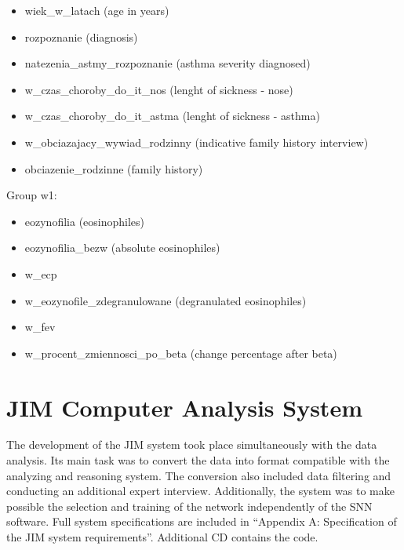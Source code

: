 \documentclass[10pt,oneside]{memoir}
\begin{document}
\begin{itemize}


\item wiek\_w\_latach (age in years)

\item rozpoznanie (diagnosis)

\item natezenia\_astmy\_rozpoznanie (asthma severity diagnosed)

\item w\_czas\_choroby\_do\_it\_nos (lenght of sickness - nose)

\item w\_czas\_choroby\_do\_it\_astma (lenght of sickness - asthma)

\item w\_obciazajacy\_wywiad\_rodzinny (indicative family history interview)

\item obciazenie\_rodzinne (family history)
\end{itemize}

Group w1:


\begin{itemize}


\item eozynofilia (eosinophiles)

\item eozynofilia\_bezw (absolute eosinophiles)

\item w\_ecp

\item w\_eozynofile\_zdegranulowane (degranulated eosinophiles)

\item w\_fev

\item w\_procent\_zmiennosci\_po\_beta (change percentage after beta)
\end{itemize}

\part{JIM Computer Analysis System}
\label{chapter6}

The development of the JIM system took place simultaneously with the data analysis. Its main task was to convert the data into format compatible with the analyzing and reasoning system. The conversion also included data filtering and conducting an additional expert interview. Additionally, the system was to make possible the selection and training of the network independently of the SNN software.
Full system specifications are included in ``Appendix A: Specification of the JIM system requirements''. Additional CD contains the code.
\end{document}
